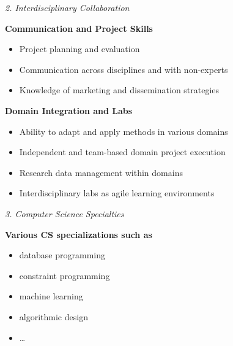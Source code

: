 \documentclass[
        english,biblatex
    ]{lni}
\providecommand{\tightlist}{%
    \setlength{\itemsep}{0pt}\setlength{\parskip}{0pt}}
\begin{document}
    \emph{2. Interdisciplinary Collaboration}

    \textbf{Communication and Project Skills}

    \begin{itemize}
    \tightlist
    \item
      Project planning and evaluation
    \item
      Communication across disciplines and with non-experts
    \item
      Knowledge of marketing and dissemination strategies
    \end{itemize}

    \textbf{Domain Integration and Labs}

    \begin{itemize}
    \tightlist
    \item
      Ability to adapt and apply methods in various domains
    \item
      Independent and team-based domain project execution
    \item
      Research data management within domains
    \item
      Interdisciplinary labs as agile learning environments
    \end{itemize}

    \emph{3. Computer Science Specialties}

    \textbf{Various CS specializations such as}

    \begin{itemize}
    \tightlist
    \item
      database programming
    \item
      constraint programming
    \item
      machine learning
    \item
      algorithmic design
    \item
      \ldots{}
    \end{itemize}

\end{document}
